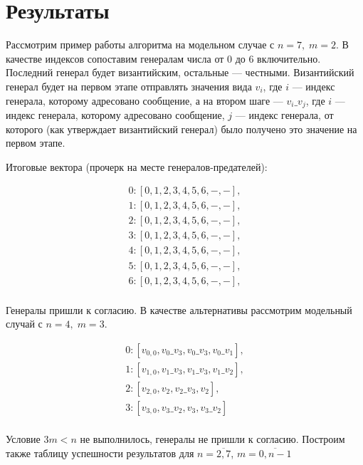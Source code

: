 \documentclass[a4paper,12pt]{article}
\begin{document}
\section{Результаты}
\quad Рассмотрим пример работы алгоритма на модельном случае с $n = 7, \; m =
2$. В качестве индексов сопоставим генералам числа от 0 до 6 включительно.
Последний генерал будет византийским, остальные --- честными.  Византийский
генерал будет на первом этапе отправлять значения вида $v_{i}$, где $i$ --- индекс
генерала, которому адресовано сообщение, а на втором шаге --- $v_{i}\_v_{j}$, где
$i$ --- индекс генерала, которому адресовано сообщение, $j$ --- индекс генерала,
от которого (как утверждает византийский генерал) было получено это значение на
первом этапе.

\quad Итоговые вектора (прочерк на месте генералов-предателей):

\begin{equation}
  \begin{gathered}
    0 : [0, 1, 2, 3, 4, 5, 6, -, -], \\
    1 : [0, 1, 2, 3, 4, 5, 6, -, -],  \\
    2 : [0, 1, 2, 3, 4, 5, 6, -, -], \\
    3 : [0, 1, 2, 3, 4, 5, 6, -, -], \\
    4 : [0, 1, 2, 3, 4, 5, 6, -, -], \\
    5 : [0, 1, 2, 3, 4, 5, 6, -, -], \\
    6 : [0, 1, 2, 3, 4, 5, 6, -, -], \\
  \end{gathered}
\end{equation}

\quad Генералы пришли к согласию.
В качестве альтернативы рассмотрим модельный случай с $n = 4, \; m = 3$.

\begin{equation}
  \begin{gathered}
    0 : [v_{0, 0}, v_{0}\_v_{3}, v_{0}\_v_{3}, v_{0}\_v_{1}], \\
    1 : [v_{1, 0}, v_{1}\_v_{3}, v_{1}\_v_{3}, v_{1}\_v_{2}],  \\
    2 : [v_{2, 0}, v_{2}, v_{2}\_v_{3}, v_{2}], \\
    3 : [v_{3, 0}, v_{3}\_v_{2}, v_{3}, v_{3}\_v_{2}] \\
  \end{gathered}
\end{equation}

Условие $ 3m < n $ не выполнилось, генералы не пришли к согласию. Построим также
таблицу успешности результатов для $ n = \overline{2, 7} $, $ m = \overline{0, n
- 1} $
\end{document}
